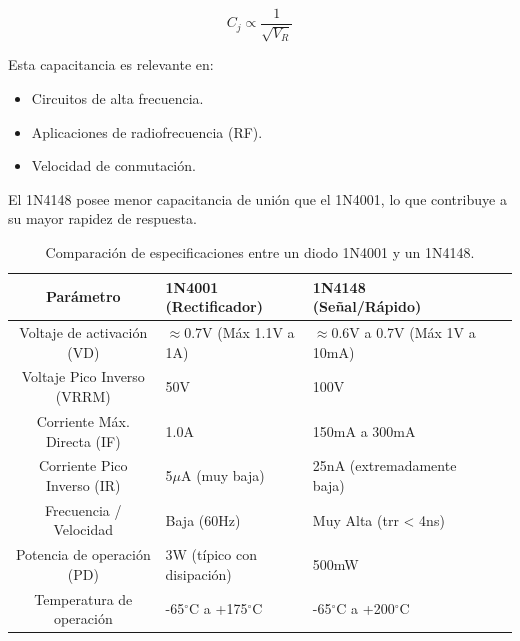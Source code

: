 \documentclass[journal]{IEEEtran}
\begin{document}
\[
C_j \propto \frac{1}{\sqrt{V_R}}
\]

Esta capacitancia es relevante en:

\begin{itemize}
    \item Circuitos de alta frecuencia.
    \item Aplicaciones de radiofrecuencia (RF).
    \item Velocidad de conmutación.
\end{itemize}

El 1N4148 posee menor capacitancia de unión que el 1N4001, lo que contribuye a su mayor rapidez de respuesta.


\begin{table}[H]
\centering
\begin{tabularx}{\columnwidth}{|c|X|X|X|X|}
\hline
\textbf{Parámetro} & \textbf{1N4001 (Rectificador)} & \textbf{1N4148 (Señal/Rápido)} \\ \hline
Voltaje de activación (VD) & $\approx$0.7V (Máx 1.1V a 1A) & $\approx$0.6V a 0.7V (Máx 1V a 10mA) \\ \hline
Voltaje Pico Inverso (VRRM) & 50V & 100V \\ \hline
Corriente Máx. Directa (IF) & 1.0A & 150mA a 300mA \\ \hline
Corriente Pico Inverso (IR) & 5$\mu$A (muy baja) & 25nA (extremadamente baja) \\ \hline
Frecuencia / Velocidad & Baja (60Hz) & Muy Alta (trr < 4ns) \\ \hline
Potencia de operación (PD) & 3W (típico con disipación) & 500mW \\ \hline
Temperatura de operación & -65$^\circ$C a +175$^\circ$C & -65$^\circ$C a +200$^\circ$C \\ \hline
\end{tabularx}
\caption{Comparación de especificaciones entre un diodo 1N4001 y un 1N4148.}
\label{tablaComparacionDiodos}
\end{table}
\end{document}

